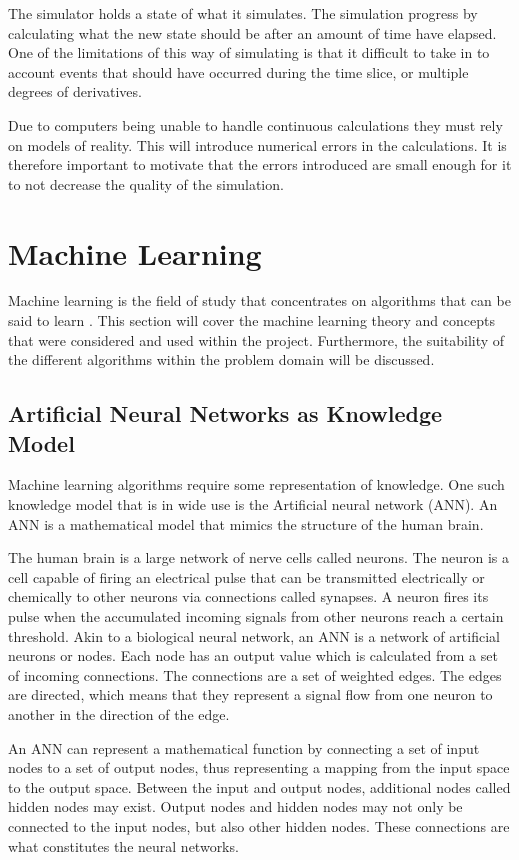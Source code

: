 The simulator holds a state of what it simulates. The simulation progress by calculating what the new state should be after an amount of time have elapsed. One of the limitations of this way of simulating is that it difficult to take in to account events that should have occurred during the time slice, or multiple degrees of derivatives. 

Due to computers being unable to handle continuous calculations they must rely on models of reality. This will introduce numerical errors in the calculations. It is therefore important to motivate that the errors introduced are small enough for it to not decrease the quality of the simulation.



\section{Machine Learning}
Machine learning is the field of study that concentrates on algorithms that can be said to learn \cite{glossary}. This section will cover the machine learning theory and concepts that were considered and used within the project. Furthermore, the suitability of the different algorithms within the problem domain will be discussed.  

\subsection{Artificial Neural Networks as Knowledge Model}
Machine learning algorithms require some representation of knowledge. One such knowledge model that is in wide use is the Artificial neural network (ANN). An ANN is a mathematical model that mimics the structure of the human brain. 

The human brain is a large network of nerve cells called neurons. The neuron is a cell capable of firing an electrical pulse that can be transmitted electrically or chemically to other neurons via connections called synapses. A neuron fires its pulse when the accumulated incoming signals from other neurons reach a certain threshold. Akin to a biological neural network, an ANN is a network of artificial neurons or nodes. Each node has an output value which is calculated from a set of incoming connections. The connections are a set of weighted edges. The edges are directed, which means that they represent a signal flow from one neuron to another in the direction of the edge.

An ANN can represent a mathematical function by connecting a set of input nodes to a set of output nodes, thus representing a mapping from the input space to the output space. Between the input and output nodes, additional nodes called hidden nodes may exist. Output nodes and hidden nodes may not only be connected to the input nodes, but also other hidden nodes. These connections are what constitutes the neural networks. 

